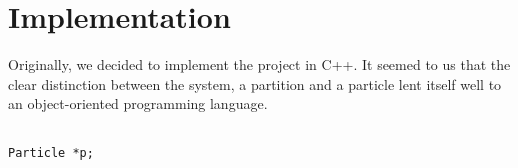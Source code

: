\section{Implementation}

Originally, we decided to implement the project in C++. It seemed to us that 
the clear distinction between the system, a partition and a particle lent 
itself well to an object-oriented programming language. 

\begin{lstlisting}

Particle *p;

\end{lstlisting}
